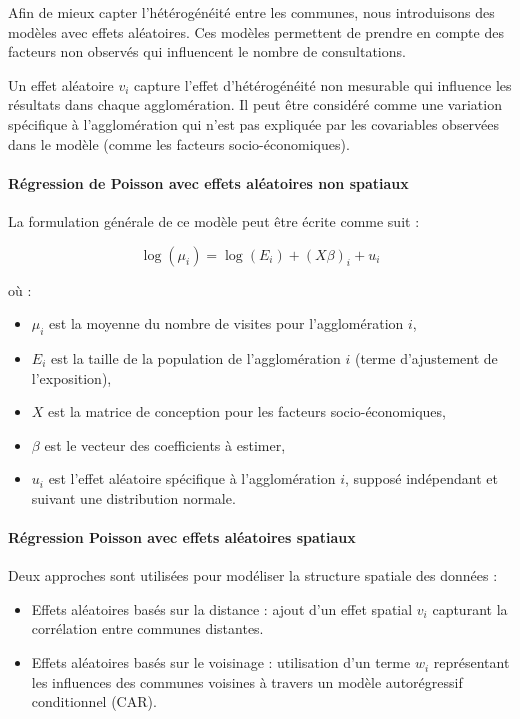 \documentclass[
]{article}
\providecommand{\tightlist}{%
  \setlength{\itemsep}{0pt}\setlength{\parskip}{0pt}}
\begin{document}
Afin de mieux capter l'hétérogénéité entre les communes, nous
introduisons des modèles avec effets aléatoires. Ces modèles permettent
de prendre en compte des facteurs non observés qui influencent le nombre
de consultations.

Un effet aléatoire \(v_i\) capture l'effet d'hétérogénéité non mesurable
qui influence les résultats dans chaque agglomération. Il peut être
considéré comme une variation spécifique à l'agglomération qui n'est pas
expliquée par les covariables observées dans le modèle (comme les
facteurs socio-économiques).

\paragraph{Régression de Poisson avec effets aléatoires non
spatiaux}\label{ruxe9gression-de-poisson-avec-effets-aluxe9atoires-non-spatiaux}

La formulation générale de ce modèle peut être écrite comme suit :

\[
\log(\mu_i) = \log(E_i) + (X\beta)_i + u_i
\]

où :

\begin{itemize}
\tightlist
\item
  \(\mu_i\) est la moyenne du nombre de visites pour l'agglomération
  \(i\),
\item
  \(E_i\) est la taille de la population de l'agglomération \(i\) (terme
  d'ajustement de l'exposition),
\item
  \(X\) est la matrice de conception pour les facteurs
  socio-économiques,
\item
  \(\beta\) est le vecteur des coefficients à estimer,
\item
  \(u_i\) est l'effet aléatoire spécifique à l'agglomération \(i\),
  supposé indépendant et suivant une distribution normale.
\end{itemize}

\paragraph{Régression Poisson avec effets aléatoires
spatiaux}\label{ruxe9gression-poisson-avec-effets-aluxe9atoires-spatiaux}

Deux approches sont utilisées pour modéliser la structure spatiale des
données :

\begin{itemize}
\item
  Effets aléatoires basés sur la distance : ajout d'un effet spatial
  \(v_i\) capturant la corrélation entre communes distantes.
\item
  Effets aléatoires basés sur le voisinage : utilisation d'un terme
  \(w_i\) représentant les influences des communes voisines à travers un
  modèle autorégressif conditionnel (CAR).
\end{itemize}
\end{document}
